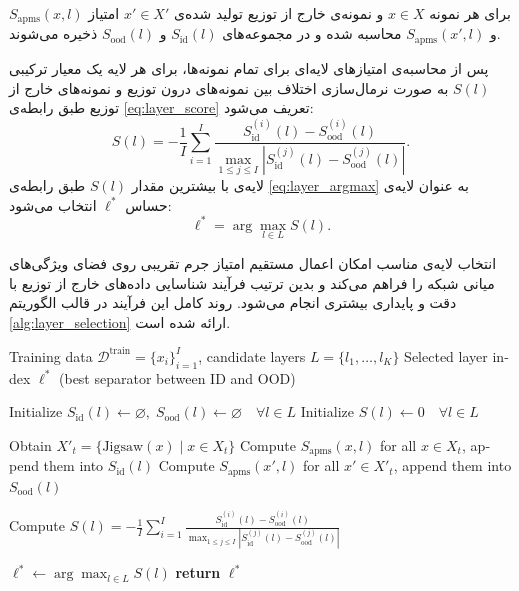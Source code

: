 برای هر نمونه $x \in X$ و نمونه‌ی خارج از توزیع تولید شده‌ی $x' \in X'$ امتیاز $S_{\mathrm{apms}}(x,l)$ و $S_{\mathrm{apms}}(x',l)$ محاسبه شده و در مجموعه‌های $S_{\mathrm{id}}(l)$ و $S_{\mathrm{ood}}(l)$ ذخیره می‌شوند.  

پس از محاسبه‌ی امتیازهای لایه‌ای برای تمام نمونه‌ها، برای هر لایه یک معیار ترکیبی $S(l)$ به صورت نرمال‌سازی اختلاف بین نمونه‌های درون توزیع و نمونه‌های خارج از توزیع طبق رابطه‌ی \ref{eq:layer_score} تعریف می‌شود:  
\begin{equation}
	\label{eq:layer_score}
	S(l) = -\frac{1}{I} \sum_{i=1}^{I} \frac{S_{\mathrm{id}}^{(i)}(l) - S_{\mathrm{ood}}^{(i)}(l)}{\max_{1\le j \le I} \left| S_{\mathrm{id}}^{(j)}(l) - S_{\mathrm{ood}}^{(j)}(l) \right|}.
\end{equation}  
لایه‌ی با بیشترین مقدار $S(l)$ طبق رابطه‌ی \ref{eq:layer_argmax} به عنوان لایه‌ی حساس $\ell^*$ انتخاب می‌شود:  
\begin{equation}
	\label{eq:layer_argmax}
	\ell^* = \arg\max_{l \in L} S(l).
\end{equation}  

انتخاب لایه‌ی مناسب امکان اعمال مستقیم امتیاز جرم تقریبی روی فضای ویژگی‌های میانی شبکه را فراهم می‌کند و بدین ترتیب فرآیند شناسایی داده‌های خارج از توزیع با دقت و پایداری بیشتری انجام می‌شود. روند کامل این فرآیند در قالب الگوریتم \ref{alg:layer_selection} ارائه شده است.  

\begin{algorithm}[t]
	\caption{شناسایی لایه‌ی بهینه در تفکیک داده‌های درون توزیع و خارج از توزیع}
	\label{alg:layer_selection}
	\begin{latin}
		\begin{algorithmic}[1]
			\Require Training data $\mathcal{D}^{\mathrm{train}} = \{x_i\}_{i=1}^I$, 
			candidate layers $L = \{l_1,\dots,l_K\}$
			\Ensure Selected layer index $\ell^*$ (best separator between ID and OOD)
			
			\State Initialize $S_{\mathrm{id}}(l) \gets \varnothing,\; S_{\mathrm{ood}}(l) \gets \varnothing \quad \forall l \in L$
			\State Initialize $S(l) \gets 0 \quad \forall l \in L$
			
			\State Obtain $X'_t = \{\mathrm{Jigsaw}(x) \mid x \in X_t\}$
			\State Compute $S_{\mathrm{apms}}(x,l)$ for all $x \in X_t$, append them into $S_{\mathrm{id}}(l)$
			\State Compute $S_{\mathrm{apms}}(x',l)$ for all $x' \in X'_t$, append them into $S_{\mathrm{ood}}(l)$
			\EndFor
			\EndFor
			
			\State Compute $S(l) = -\frac{1}{I} \sum_{i=1}^{I} 
			\frac{S_{\mathrm{id}}^{(i)}(l) - S_{\mathrm{ood}}^{(i)}(l)}
			{\max_{1 \le j \le I} \left| S_{\mathrm{id}}^{(j)}(l) - S_{\mathrm{ood}}^{(j)}(l) \right|}$
			\EndFor
			
			
			\State $\ell^* \gets \arg\max_{l \in L} S(l)$
			\State \textbf{return} $\ell^*$
		\end{algorithmic}
	\end{latin}
\end{algorithm}

